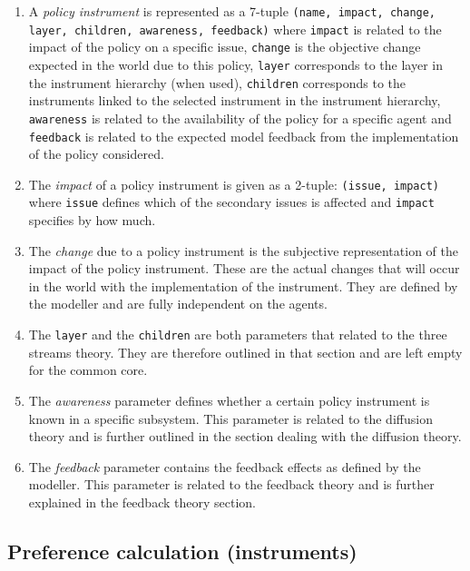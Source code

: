 \begin{enumerate}
\item A \emph{policy instrument} is represented as a 7-tuple \texttt{(name, impact, change, layer, children, awareness, feedback)} where \texttt{impact} is related to the impact of the policy on a specific issue, \texttt{change} is the objective change expected in the world due to this policy, \texttt{layer} corresponds to the layer in the instrument hierarchy (when used), \texttt{children} corresponds to the instruments linked to the selected instrument in the instrument hierarchy, \texttt{awareness} is related to the availability of the policy for a specific agent and \texttt{feedback} is related to the expected model feedback from the implementation of the policy considered.

\item The \emph{impact} of a policy instrument is given as a 2-tuple: \texttt{(issue, impact)} where \texttt{issue} defines which of the secondary issues is affected and \texttt{impact} specifies by how much.

\item The \emph{change} due to a policy instrument is the subjective representation of the impact of the policy instrument. These are the actual changes that will occur in the world with the implementation of the instrument. They are defined by the modeller and are fully independent on the agents.

\item The \texttt{layer} and the \texttt{children} are both parameters that related to the three streams theory. They are therefore outlined in that section and are left empty for the common core.

\item The \emph{awareness} parameter defines whether a certain policy instrument is known in a specific subsystem. This parameter is related to the diffusion theory and is further outlined in the section dealing with the diffusion theory.

\item The \emph{feedback} parameter contains the feedback effects as defined by the modeller. This parameter is related to the feedback theory and is further explained in the feedback theory section.
\end{enumerate}

\subsection{Preference calculation (instruments)}

